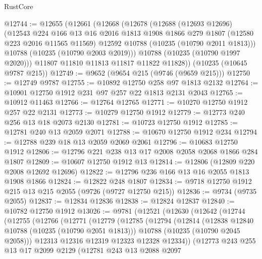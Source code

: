 \begin{lexlean}{RustCore}
\begin{coremodule}
@12744 := @12655
    (@12661
      (@12668
        (@12678
          (@12688
            (@12693 @12696)
            (@12543
              @224
              @166
              @13
              @16
              @2016
              @1813
              @1908
              @1866
              @279
              @1807
              (@12580 @223 @2016 @11565 @11569)
              @12592
              @10788
              (@10235 (@10790 @2011 @1813)))
            @10788
            (@10235 (@10790 @2003 @2019)))
          @10788
          (@10235 (@10790 @1997 @2020)))
        @11807
        @11810
        @11813
        @11817
        @11822
        @11828))
    (@10235 (@10645 @9787 @215))
@12749 := @9652 (@9654 @215 (@9746 (@9659 @215)))
@12750 := @12749 @9787
@12755 := @10892 @12750 @258 @97 @1813 @2132
@12764 := @10901 @12750 @1912 @231 @97 @257 @22 @1813 @2131 @2043
@12765 := @10912 @11463
@12766 := @12764 @12765
@12771 := @10270 @12750 @1912 @257 @22 @2131
@12773 := @10279 @12750 @1912
@12779 := @12773 @240 @256 @13 @18 @2073 @2130
@12781 := @10723 @12750 @1912
@12785 := @12781 @240 @13 @2059 @2071
@12788 := @10670 @12750 @1912 @234
@12794 := @12788 @239 @18 @13 @2059 @2069 @2061
@12796 := @10683 @12750 @1912
@12806 := @12796 @221 @238 @13 @17 @2008 @2058 @2068 @1866 @284 @1807
@12809 := @10607 @12750 @1912 @13
@12814 := @12806 (@12809 @220 @2008 @12692 @12696)
@12822 := @12796 @236 @166 @13 @16 @2055 @1813 @1908 @1866
@12824 := @12822 @248 @1807
@12834 := @9718 @12750 @1912 @215 @13 @215 @2055 (@9726 (@9727 @12750 @215))
@12836 := @9734 (@9735 @2055)
@12837 := @12834 @12836
@12838 := @12824 @12837
@12840 := @10782 @12750 @1912
@13026 := @9781
    (@12521
      (@12630
        (@12642
          (@12744
            (@12755
              (@12766
                (@12771
                  (@12779
                    (@12785
                      (@12794
                        (@12814
                          (@12838 @12840 @10788 (@10235 (@10790 @2051 @1813)))
                          @10788
                          (@10235 (@10790 @2045 @2058)))
                        @12313
                        @12316
                        @12319
                        @12323
                        @12328
                        @12334))
                    (@12773
                      @243
                      @255
                      @13
                      @17
                      @2099
                      @2129
                      (@12781
                        @243
                        @13
                        @2088
                        @2097

\end{coremodule}
\end{lexlean}
